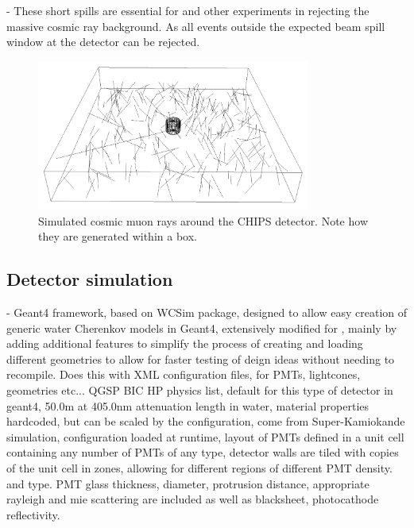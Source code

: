 - These short spills are essential for \chips and other experiments in rejecting the massive
cosmic ray background. As all events outside the expected beam spill window at the detector can be
rejected.

\begin{figure} %
    \includegraphics[width=0.8\textwidth]{diagrams/4-chips/cosmics.png}
    \caption[Cosmic muon rays around the CHIPS detector]
    {Simulated cosmic muon rays around the CHIPS detector. Note how they are generated within a
        box.}
    \label{fig:cosmics}
\end{figure}

\subsection{Detector simulation} %
\label{sec:chips_monte_carlo_sim} %

- Geant4 framework, based on WCSim package, designed to allow easy creation of generic water
Cherenkov models in Geant4, extensively modified for \chips, mainly by adding additional features
to simplify the process of creating and loading different geometries to allow for faster testing
of deign ideas without needing to recompile. Does this with XML configuration files, for PMTs,
lightcones, geometries etc... QGSP BIC HP physics list, default for this type of detector in
geant4, 50.0m at 405.0nm attenuation length in water, material properties hardcoded, but can be
scaled by the configuration, come from Super-Kamiokande simulation, configuration loaded at
runtime, layout of PMTs defined in a unit cell containing any number of PMTs of any type, detector
walls are tiled with copies of the unit cell in zones, allowing for different regions of different
PMT density. and type. PMT glass thickness, diameter, protrusion distance, appropriate rayleigh
and mie scattering are included as well as blacksheet, photocathode reflectivity.

